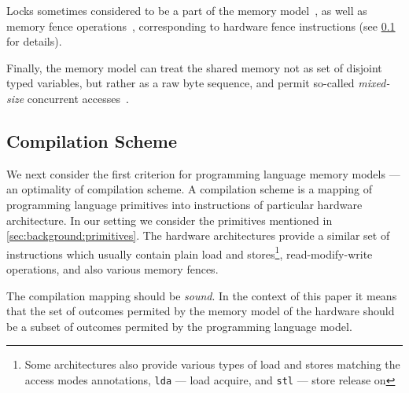 Locks sometimes considered to be a part 
of the memory model~\cite{Manson-al:POPL05}, 
as well as memory fence operations~\cite{Batty-al:POPL11},
corresponding to hardware fence instructions
(see \cref{sec:background:compile} for details). 

Finally, the memory model can treat the shared memory 
not as set of disjoint typed variables, but rather as 
a raw byte sequence, and permit so-called \emph{mixed-size} 
concurrent accesses~\cite{Flur-al:POPL17}. 



\subsection{Compilation Scheme}
\label{sec:background:compile}

We next consider the first criterion for 
programming language memory models --- 
an optimality of compilation scheme. 
A compilation scheme is a mapping of 
programming language primitives into 
instructions of particular hardware architecture. 
In our setting we consider the primitives 
mentioned in \cref{sec:background:primitives}.
The hardware architectures provide a similar set 
of instructions which usually contain 
plain load and stores\footnote{Some architectures 
also provide various types of load and stores
matching the access modes annotations, 
\eg \texttt{lda} --- load acquire, 
and \texttt{stl} --- store release on }, 
read-modify-write operations, 
and also various memory fences.    

The compilation mapping should be \emph{sound}.
In the context of this paper it means that 
the set of outcomes permited by the 
memory model of the hardware should be 
a subset of outcomes permited by the 
programming language model. 

